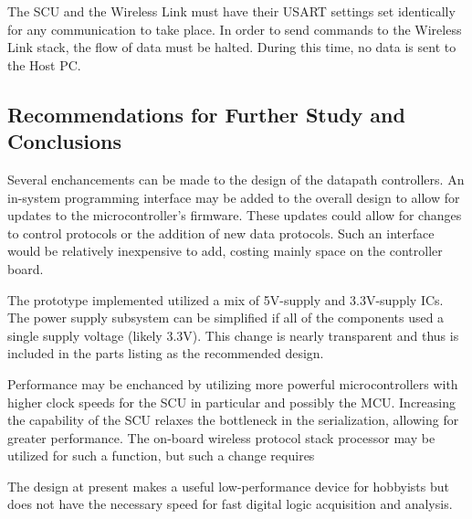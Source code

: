 The SCU and the Wireless Link must have their USART settings set identically for any communication to take place. In order to send commands to the Wireless Link
stack, the flow of data must be halted. During this time, no data is sent to the
Host PC.  

\subsection{Recommendations for Further Study and Conclusions}
Several enchancements can be made to the design of the datapath controllers.
An in-system programming interface may be added to the overall design to allow
for updates to the microcontroller's firmware. These updates could allow for 
changes to control protocols or the addition of new data protocols. Such an 
interface would be relatively inexpensive to add, costing mainly space on the 
controller board.

The prototype implemented utilized a mix of 5V-supply and 3.3V-supply ICs. The 
power supply subsystem can be simplified if all of the components used a single
supply voltage (likely 3.3V). This change is nearly transparent and thus is included in the parts listing as the recommended design.

Performance may be enchanced by utilizing more powerful microcontrollers with
higher clock speeds for the SCU in particular and possibly the MCU. Increasing 
the capability of the SCU relaxes the bottleneck in the serialization, allowing for greater performance. The on-board wireless protocol stack processor may be 
utilized for such a function, but such a change requires 

The design at present makes a useful low-performance device for hobbyists but 
does not have the necessary speed for fast digital logic acquisition and 
analysis. 
